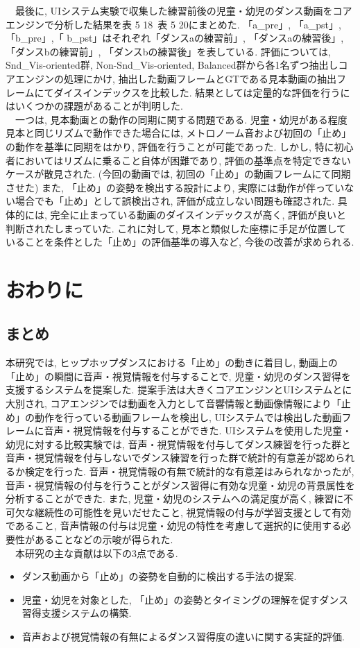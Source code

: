 \documentclass[paper]{ieicej}
\begin{document}
　最後に, UIシステム実験で収集した練習前後の児童・幼児のダンス動画をコアエンジンで分析した結果を表 5 18~表 5 20にまとめた. 「a\_pre」, 「a\_pst」, 「b\_pre」,「 b\_pst」はそれぞれ「ダンスaの練習前」, 「ダンスaの練習後」, 「ダンスbの練習前」, 「ダンスbの練習後」を表している. 評価については, Snd\_Vis-oriented群, Non-Snd\_Vis-oriented, Balanced群から各1名ずつ抽出しコアエンジンの処理にかけ, 抽出した動画フレームとGTである見本動画の抽出フレームにてダイスインデックスを比較した. 結果としては定量的な評価を行うにはいくつかの課題があることが判明した. \\
　一つは, 見本動画との動作の同期に関する問題である. 児童・幼児がある程度見本と同じリズムで動作できた場合には, メトロノーム音および初回の「止め」の動作を基準に同期をはかり, 評価を行うことが可能であった. しかし, 特に初心者においてはリズムに乗ること自体が困難であり, 評価の基準点を特定できないケースが散見された. (今回の動画では, 初回の「止め」の動画フレームにて同期させた) また, 「止め」の姿勢を検出する設計により, 実際には動作が伴っていない場合でも「止め」として誤検出され, 評価が成立しない問題も確認された. 具体的には, 完全に止まっている動画のダイスインデックスが高く, 評価が良いと判断されたしまっていた. これに対して, 見本と類似した座標に手足が位置していることを条件とした「止め」の評価基準の導入など, 今後の改善が求められる.
\section{おわりに}
\subsection{まとめ}
本研究では, ヒップホップダンスにおける「止め」の動きに着目し, 動画上の「止め」の瞬間に音声・視覚情報を付与することで, 児童・幼児のダンス習得を支援するシステムを提案した. 提案手法は大きくコアエンジンとUIシステムとに大別され, コアエンジンでは動画を入力として音響情報と動画像情報により「止め」の動作を行っている動画フレームを検出し, UIシステムでは検出した動画フレームに音声・視覚情報を付与することができた. UIシステムを使用した児童・幼児に対する比較実験では, 音声・視覚情報を付与してダンス練習を行った群と音声・視覚情報を付与しないでダンス練習を行った群で統計的有意差が認められるか検定を行った. 音声・視覚情報の有無で統計的な有意差はみられなかったが, 音声・視覚情報の付与を行うことがダンス習得に有効な児童・幼児の背景属性を分析することができた. また, 児童・幼児のシステムへの満足度が高く, 練習に不可欠な継続性の可能性を見いだせたこと, 視覚情報の付与が学習支援として有効であること, 音声情報の付与は児童・幼児の特性を考慮して選択的に使用する必要性があることなどの示唆が得られた. \\
　本研究の主な貢献は以下の3点である.
\begin{itemize}[nosep]
  \item ダンス動画から「止め」の姿勢を自動的に検出する手法の提案. 
  \item 児童・幼児を対象とした, 「止め」の姿勢とタイミングの理解を促すダンス習得支援システムの構築. 
  \item 音声および視覚情報の有無によるダンス習得度の違いに関する実証的評価.
\end{itemize}
\end{document}

